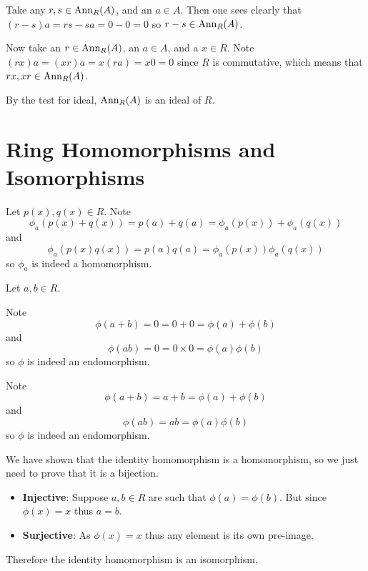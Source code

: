 \begin{questions}
    Take any $r, s \in \mathrm{Ann}_{R}(A)$, and an $a \in A$. Then one sees clearly that $(r-s)a = rs - sa = 0 - 0 = 0$ so $r-s \in \mathrm{Ann}_{R}(A)$.

    Now take an $r \in \mathrm{Ann}_{R}(A)$, an $a \in A$, and a $x \in R$. Note $(rx)a = (xr)a = x(ra) = x0 = 0$ since $R$ is commutative, which means that $rx, xr \in \mathrm{Ann}_{R}(A)$.

    By the test for ideal, $\mathrm{Ann}_{R}(A)$ is an ideal of $R$.
\end{questions}

\section{Ring Homomorphisms and Isomorphisms}
\begin{questions}
    \item Let $p(x), q(x) \in R$. Note
    \[
        \phi_a(p(x)+q(x)) = p(a) + q(a) = \phi_a(p(x)) + \phi_a(q(x))
    \]
    and
    \[
        \phi_a(p(x)q(x)) = p(a)q(a) = \phi_a(p(x))\phi_a(q(x))
    \]
    so $\phi_a$ is indeed a homomorphism.

    \item Let $a, b \in R$.
    \begin{partquestions}{\alph*}
        \item Note
        \[
            \phi(a+b) = 0 = 0 + 0 = \phi(a) + \phi(b)
        \]
        and
        \[
            \phi(ab) = 0 = 0\times0 = \phi(a)\phi(b)
        \]
        so $\phi$ is indeed an endomorphism.

        \item Note
        \[
            \phi(a+b) = a + b = \phi(a) + \phi(b)
        \]
        and
        \[
            \phi(ab) = ab = \phi(a)\phi(b)
        \]
        so $\phi$ is indeed an endomorphism.
    \end{partquestions}

    \item We have shown that the identity homomorphism is a homomorphism, so we just need to prove that it is a bijection.
    \begin{itemize}
        \item \textbf{Injective}: Suppose $a, b \in R$ are such that $\phi(a) = \phi(b)$. But since $\phi(x) = x$ thus $a = b$.
        \item \textbf{Surjective}: As $\phi(x) = x$ thus any element is its own pre-image.
    \end{itemize}
    Therefore the identity homomorphism is an isomorphism.


\end{questions}
